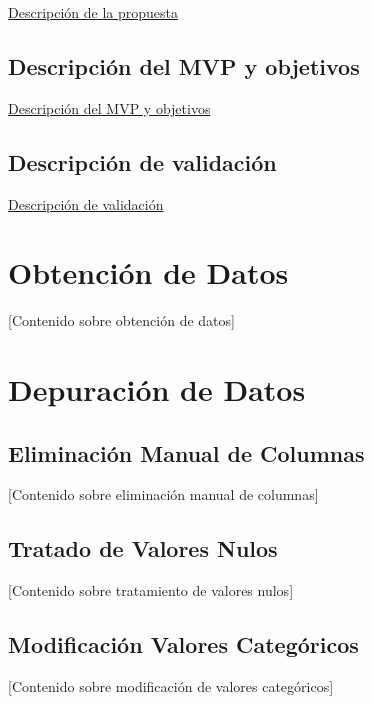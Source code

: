 \documentclass[
  12pt,
]{book}
\begin{document}
\hyperref[descripciuxf3n-de-la-propuesta]{Descripción de la propuesta}

\section{Descripción del MVP y
objetivos}\label{descripciuxf3n-del-mvp-y-objetivos}

\hyperref[descripciuxf3n-del-mvp-y-objetivos]{Descripción del MVP y
objetivos}

\section{Descripción de
validación}\label{descripciuxf3n-de-validaciuxf3n}

\hyperref[descripciuxf3n-de-validaciuxf3n]{Descripción de validación}

\chapter{Obtención de Datos}\label{obtenciuxf3n-de-datos}

{[}Contenido sobre obtención de datos{]}

\chapter{Depuración de Datos}\label{depuraciuxf3n-de-datos}

\section{Eliminación Manual de
Columnas}\label{eliminaciuxf3n-manual-de-columnas}

{[}Contenido sobre eliminación manual de columnas{]}

\section{Tratado de Valores Nulos}\label{tratado-de-valores-nulos}

{[}Contenido sobre tratamiento de valores nulos{]}

\section{Modificación Valores
Categóricos}\label{modificaciuxf3n-valores-categuxf3ricos}

{[}Contenido sobre modificación de valores categóricos{]}
\end{document}
